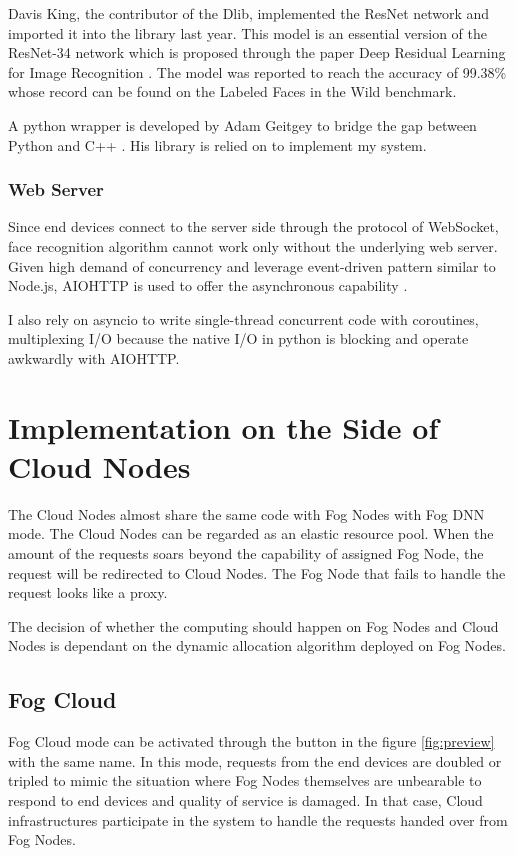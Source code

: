 Davis King, the contributor of the Dlib, implemented the ResNet network and imported it into the library last year. This model is an essential version of the ResNet-34 network which is proposed through the paper Deep Residual Learning for Image Recognition  \cite{he2016deep}. The model was reported to reach the accuracy of 99.38\% whose record can be found on the Labeled Faces in the Wild benchmark.

A python wrapper is developed by Adam Geitgey to bridge the gap between Python and C++ \cite{python-facerecognition}. His library is relied on to implement my system.

\subsubsection{Web Server}
Since end devices connect to the server side through the protocol of WebSocket, face recognition algorithm cannot work only without the underlying web server. Given high demand of concurrency and leverage event-driven pattern similar to Node.js, AIOHTTP is used to offer the asynchronous capability \cite{python-aiohttp}.

I also rely on asyncio to write single-thread concurrent code with coroutines, multiplexing I/O because the native I/O in python is blocking and operate awkwardly with AIOHTTP. 

\section{Implementation on the Side of Cloud Nodes}
The Cloud Nodes almost share the same code with Fog Nodes with Fog DNN mode. The Cloud Nodes can be regarded as an elastic resource pool. When the amount of the requests soars beyond the capability of assigned Fog Node, the request will be redirected to Cloud Nodes. The Fog Node that fails to handle the request looks like a proxy.

The decision of whether the computing should happen on Fog Nodes and Cloud Nodes is dependant on the dynamic allocation algorithm deployed on Fog Nodes.

\subsection{Fog Cloud}
Fog Cloud mode can be activated through the button in the figure \ref{fig:preview} with the same name. In this mode, requests from the end devices are doubled or tripled to mimic the situation where Fog Nodes themselves are unbearable to respond to end devices and quality of service is damaged. In that case, Cloud infrastructures participate in the system to handle the requests handed over from Fog Nodes.

